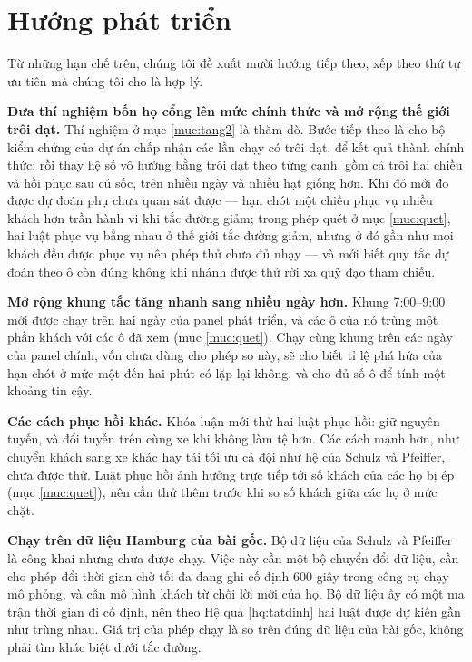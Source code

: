 \section{Hướng phát triển}

Từ những hạn chế trên, chúng tôi đề xuất mười hướng tiếp theo, xếp theo thứ tự ưu tiên mà chúng
tôi cho là hợp lý.

\textbf{Đưa thí nghiệm bốn họ cổng lên mức chính thức và mở rộng thế giới trôi dạt.} Thí nghiệm ở
mục \ref{muc:tang2} là thăm dò. Bước tiếp theo là cho bộ kiểm chứng của dự án chấp nhận các lần chạy
có trôi dạt, để kết quả thành chính thức; rồi thay hệ số vô hướng bằng trôi dạt theo từng cạnh, gồm
cả trôi hai chiều và hồi phục sau cú sốc, trên nhiều ngày và nhiều hạt giống hơn. Khi đó mới đo được
dự đoán phụ chưa quan sát được --- hạn chót một chiều phục vụ nhiều khách hơn trần hành vi khi tắc
đường giảm; trong phép quét ở mục \ref{muc:quet}, hai luật phục vụ bằng nhau ở thế giới tắc đường
giảm, nhưng ở đó gần như mọi khách đều được phục vụ nên phép thử chưa đủ nhạy --- và mới biết quy tắc dự đoán theo ô còn đúng không khi nhánh được thử rời xa quỹ đạo
tham chiếu.

\textbf{Mở rộng khung tắc tăng nhanh sang nhiều ngày hơn.} Khung 7:00--9:00 mới được chạy trên hai ngày
của panel phát triển, và các ô của nó trùng một phần khách với các ô đã xem (mục \ref{muc:quet}). Chạy cùng
khung trên các ngày của panel chính, vốn chưa dùng cho phép so này, sẽ cho biết tỉ lệ phá hứa của hạn chót ở
mức một đến hai phút có lặp lại không, và cho đủ số ô để tính một khoảng tin cậy.

\textbf{Các cách phục hồi khác.} Khóa luận mới thử hai luật phục hồi: giữ nguyên tuyến, và đổi tuyến
trên cùng xe khi không làm tệ hơn. Các cách mạnh hơn, như chuyển khách sang xe khác hay tái tối ưu cả
đội như hệ của Schulz và Pfeiffer, chưa được thử. Luật phục hồi ảnh hưởng trực tiếp tới số khách của
các họ bị ép (mục \ref{muc:quet}), nên cần thử thêm trước khi so số khách giữa các họ ở mức chặt.

\textbf{Chạy trên dữ liệu Hamburg của bài gốc.} Bộ dữ liệu của Schulz và Pfeiffer là công khai
nhưng chưa được chạy. Việc này cần một bộ chuyển đổi dữ liệu, cần cho phép đổi thời gian chờ tối đa
đang ghi cố định 600 giây trong công cụ chạy mô phỏng, và cần mô hình khách từ chối lời mời của họ. Bộ dữ
liệu ấy có một ma trận thời gian đi cố định, nên theo Hệ quả \ref{hq:tatdinh} hai luật được dự kiến
gần như trùng nhau. Giá trị của phép chạy là so trên đúng dữ liệu của bài gốc, không phải tìm khác
biệt dưới tắc đường.

